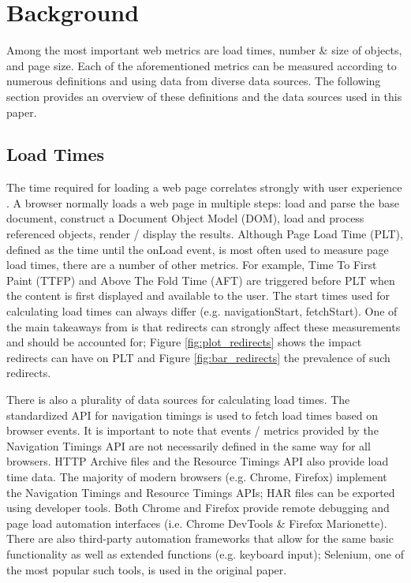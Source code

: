 \section{Background}
\label{sec:background}
Among the most important web metrics are load times, number \& size of objects, and page size. Each of the aforementioned metrics can be measured according to numerous definitions and using data from diverse data sources. The following section provides an overview of these definitions and the data sources used in this paper.

\subsection{Load Times}
The time required for loading a web page correlates strongly with user experience \cite{6263888}. A browser normally loads a web page in multiple steps: load and parse the base document, construct a Document Object Model (DOM), load and process referenced objects, render / display the results. Although Page Load Time (PLT), defined as the time until the onLoad event, is most often used to measure page load times, there are a number of other metrics. For example, Time To First Paint (TTFP) and Above The Fold Time (AFT) are triggered before PLT when the content is first displayed and available to the user. The start times used for calculating load times can always differ (e.g. navigationStart, fetchStart). One of the main takeaways from \cite{10.1007/978-3-030-15986-3_19} is that redirects can strongly affect these measurements and should be accounted for; Figure \ref{fig:plot_redirects} shows the impact redirects can have on PLT and Figure \ref{fig:bar_redirects} the prevalence of such redirects. 

There is also a plurality of data sources for calculating load times. The standardized API for navigation timings \cite{timing_2012} is used to fetch load times based on browser events. It is important to note that events / metrics provided by the Navigation Timings API are not necessarily defined in the same way for all browsers. HTTP Archive files \cite{har_format_2012} and the Resource Timings API \cite{w3c_2020} also provide load time data. The majority of modern browsers (e.g. Chrome, Firefox) implement the Navigation Timings and Resource Timings APIs; HAR files can be exported using developer tools. Both Chrome and Firefox provide remote debugging and page load automation interfaces (i.e. Chrome DevTools \& Firefox Marionette). There are also third-party automation frameworks that allow for the same basic functionality as well as extended functions (e.g. keyboard input); Selenium, one of the most popular such tools, is used in the original paper.

